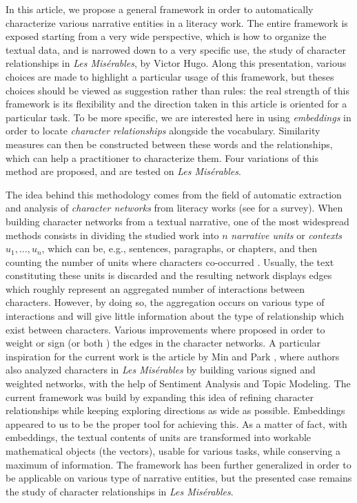 \documentclass[
twocolumn,
]{ceurart}
\begin{document}
In this article, we propose a general framework in order to automatically characterize various narrative entities in a literacy work. The entire framework is exposed starting from a very wide perspective, which is how to organize the textual data, and is narrowed down to a very specific use, the study of character relationships in \emph{Les Misérables}, by Victor Hugo. Along this presentation, various choices are made to highlight a particular usage of this framework, but theses choices should be viewed as suggestion rather than rules: the real strength of this framework is its flexibility and the direction taken in this article is oriented for a particular task. To be more specific, we are interested here in using \emph{embeddings} in order to locate \emph{character relationships} alongside the vocabulary. Similarity measures can then be constructed between these words and the relationships, which can help a practitioner to characterize them. Four variations of this method are proposed, and are tested on \emph{Les Misérables}.

The idea behind this methodology comes from the field of automatic extraction and analysis of \emph{character networks} from literacy works (see \cite{Labatut2019} for a survey). When building character networks from a textual narrative, one of the most widespread methods consists in dividing the studied work into $n$ \emph{narrative units} or \emph{contexts} $u_1, \ldots, u_n$, which can be, e.g., sentences, paragraphs, or chapters, and then counting the number of units where characters co-occurred \cite{Elsner2012, Lee2012, Rochat2014, Grener2017, Min2019}. Usually, the text constituting these units is discarded and the resulting network displays edges which roughly represent an aggregated number of interactions between characters. However, by doing so, the aggregation occurs on various type of interactions and will give little information about the type of relationship which exist between characters. Various improvements where proposed in order to weight \cite{Sack2014} or sign \cite{Krishnan2015} (or both \cite{Min2019}) the edges in the character networks. A particular inspiration for the current work is the article by Min and Park \cite{Min2019}, where authors also analyzed characters in \emph{Les Misérables} by building various signed and weighted networks, with the help of Sentiment Analysis and Topic Modeling. The current framework was build by expanding this idea of refining character relationships while keeping exploring directions as wide as possible. Embeddings \cite{Incitti2023} appeared to us to be the proper tool for achieving this. As a matter of fact, with embeddings, the textual contents of units are transformed into workable mathematical objects (the vectors), usable for various tasks, while conserving a maximum of information. The framework has been further generalized in order to be applicable on various type of narrative entities, but the presented case remains the study of character relationships in \emph{Les Misérables}. 
\end{document}
